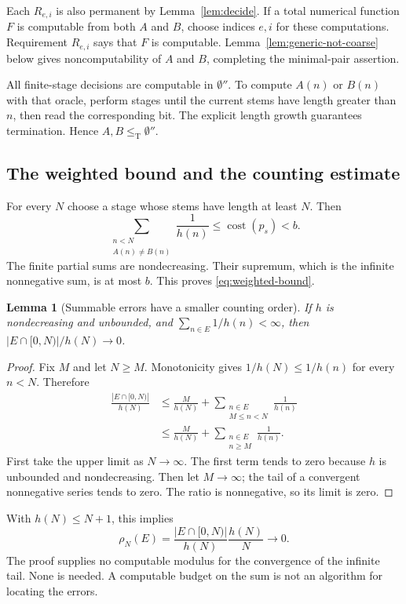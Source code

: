 \documentclass[11pt,a4paper]{article}
\newcommand{\leT}{\leq_{\mathrm T}}
\newcommand{\cost}{\operatorname{cost}}
\newtheorem{lemma}[theorem]{Lemma}
\theoremstyle{definition}
\theoremstyle{remark}
\begin{document}
Each $R_{e,i}$ is also permanent by Lemma~\ref{lem:decide}. If a total numerical function $F$ is computable from both $A$ and $B$, choose indices $e,i$ for these computations. Requirement $R_{e,i}$ says that $F$ is computable. Lemma~\ref{lem:generic-not-coarse} below gives noncomputability of $A$ and $B$, completing the minimal-pair assertion.

All finite-stage decisions are computable in $\emptyset''$. To compute $A(n)$ or $B(n)$ with that oracle, perform stages until the current stems have length greater than $n$, then read the corresponding bit. The explicit length growth guarantees termination. Hence $A,B\leT\emptyset''$.

\subsection{The weighted bound and the counting estimate}
For every $N$ choose a stage whose stems have length at least $N$. Then
\[
\sum_{\substack{n<N\\A(n)\ne B(n)}}\frac1{h(n)}
\leq\cost(p_s)<b.
\]
The finite partial sums are nondecreasing. Their supremum, which is the infinite nonnegative sum, is at most $b$. This proves \eqref{eq:weighted-bound}.

\begin{lemma}[Summable errors have a smaller counting order]\label{lem:count}
If $h$ is nondecreasing and unbounded, and
$\sum_{n\in E}1/h(n)<\infty$, then
$|E\cap[0,N)|/h(N)\to0$.
\end{lemma}
\begin{proof}
Fix $M$ and let $N\geq M$. Monotonicity gives $1/h(N)\leq1/h(n)$ for every $n<N$. Therefore
\begin{align*}
\frac{|E\cap[0,N)|}{h(N)}
&\leq\frac{M}{h(N)}+
\sum_{\substack{n\in E\\M\leq n<N}}\frac1{h(n)}\\
&\leq\frac{M}{h(N)}+
\sum_{\substack{n\in E\\n\geq M}}\frac1{h(n)}.
\end{align*}
First take the upper limit as $N\to\infty$. The first term tends to zero because $h$ is unbounded and nondecreasing. Then let $M\to\infty$; the tail of a convergent nonnegative series tends to zero. The ratio is nonnegative, so its limit is zero.
\end{proof}

With $h(N)\leq N+1$, this implies
\[
\rho_N(E)=\frac{|E\cap[0,N)|}{h(N)}\frac{h(N)}{N}\longrightarrow0.
\]
The proof supplies no computable modulus for the convergence of the infinite tail. None is needed. A computable budget on the sum is not an algorithm for locating the errors.
\end{document}
